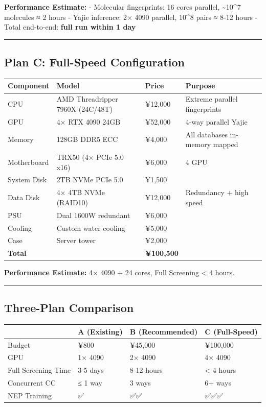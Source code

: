 \documentclass[
  12pt,
]{article}
\begin{document}
\textbf{Performance Estimate:} - Molecular fingerprints: 16 cores parallel, \textasciitilde10\^{}7 molecules ≈ 2 hours - Yajie inference: 2× 4090 parallel, 10\^{}8 pairs ≈ 8-12 hours - Total end-to-end: \textbf{full run within 1 day}

\begin{center}\rule{0.5\linewidth}{0.5pt}\end{center}

\subsection{Plan C: Full-Speed Configuration}\label{plan-c-full-speed-configuration}

\begin{longtable}[]{@{}llll@{}}
\toprule\noalign{}
Component & Model & Price & Purpose \\
\midrule\noalign{}
\endhead
\bottomrule\noalign{}
\endlastfoot
CPU & AMD Threadripper 7960X (24C/48T) & ¥12,000 & Extreme parallel fingerprints \\
GPU & 4× RTX 4090 24GB & ¥52,000 & 4-way parallel Yajie \\
Memory & 128GB DDR5 ECC & ¥4,000 & All databases in-memory mapped \\
Motherboard & TRX50 (4× PCIe 5.0 x16) & ¥6,000 & 4 GPU \\
System Disk & 2TB NVMe PCIe 5.0 & ¥1,500 & \\
Data Disk & 4× 4TB NVMe (RAID10) & ¥12,000 & Redundancy + high speed \\
PSU & Dual 1600W redundant & ¥6,000 & \\
Cooling & Custom water cooling & ¥5,000 & \\
Case & Server tower & ¥2,000 & \\
\textbf{Total} & & \textbf{¥100,500} & \\
\end{longtable}

\textbf{Performance Estimate:} 4× 4090 + 24 cores, Full Screening \textless{} 4 hours.

\begin{center}\rule{0.5\linewidth}{0.5pt}\end{center}

\subsection{Three-Plan Comparison}\label{three-plan-comparison}

\begin{longtable}[]{@{}llll@{}}
\toprule\noalign{}
& A (Existing) & B (Recommended) & C (Full-Speed) \\
\midrule\noalign{}
\endhead
\bottomrule\noalign{}
\endlastfoot
Budget & ¥800 & ¥45,000 & ¥100,000 \\
GPU & 1× 4090 & 2× 4090 & 4× 4090 \\
Full Screening Time & 3-5 days & 8-12 hours & \textless{} 4 hours \\
Concurrent CC & ≤ 1 way & 3 ways & 6+ ways \\
NEP Training & ✅ & ✅✅ & ✅✅✅ \\
\end{longtable}
\end{document}
